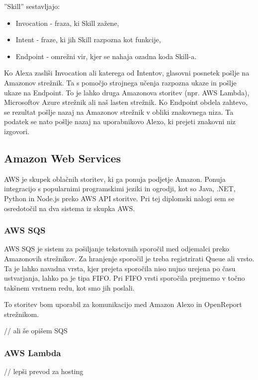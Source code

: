 \documentclass[a4paper, 12pt]{book}
\begin{document}
''Skill'' sestavljajo:
\begin{itemize}
	\item Invocation - fraza, ki Skill zažene,
	\item Intent - fraze, ki jih Skill razpozna kot funkcije,
	\item Endpoint - omrežni vir, kjer se nahaja ozadna koda Skill-a.
\end{itemize}

Ko Alexa zasliši Invocation ali katerega od Intentov, glasovni posnetek pošlje na Amazonov strežnik.
Ta s pomočjo strojnega učenja razpozna ukaze in pošlje ukaze na Endpoint.
To je lahko druga Amazonova storitev (npr. AWS Lambda), Microsoftov Azure strežnik ali naš lasten strežnik.
Ko Endpoint obdela zahtevo, se rezultat pošlje nazaj na Amazonov strežnik v obliki znakovnega niza.
Ta podatek se nato pošlje nazaj na uporabnikovo Alexo, ki prejeti znakovni niz izgovori.

\subsection{Amazon Web Services}

AWS je skupek oblačnih storitev, ki ga ponuja podjetje Amazon.
Ponuja integracijo s popularnimi programskimi jeziki in ogrodji, kot so Java, .NET, Python in Node.js preko AWS API storitve.
Pri tej diplomski nalogi sem se osredotočil na dva sistema iz skupka AWS.

\subsubsection{AWS SQS}

AWS SQS je sistem za pošiljanje tekstovnih sporočil med odjemalci preko Amazonovih strežnikov.
Za hranjenje sporočil je treba registrirati Queue ali vrsto. 
Ta je lahko navadna vrsta, kjer prejeta sporočila niso nujno urejena po času ustvarjanja, lahko pa je tipa FIFO.
Pri FIFO vrsti sporočila prejmemo v točno takšnem vrstnem redu, kot smo jih poslali.

To storitev bom uporabil za komunikacijo med Amazon Alexo in OpenReport strežnikom.

// ali še opišem SQS

\subsubsection{AWS Lambda}

// lepši prevod za hosting
\end{document}
